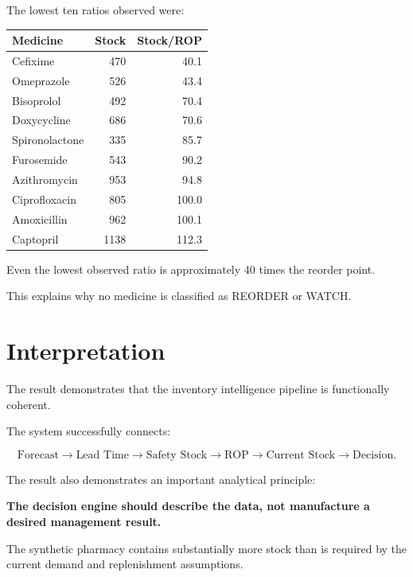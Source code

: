 \documentclass[11pt,a4paper]{article}
\begin{document}
The lowest ten ratios observed were:

\begin{center}
\begin{tabular}{lrr}
\toprule
\textbf{Medicine} & \textbf{Stock} & \textbf{Stock/ROP}\\
\midrule
Cefixime & 470 & 40.1\\
Omeprazole & 526 & 43.4\\
Bisoprolol & 492 & 70.4\\
Doxycycline & 686 & 70.6\\
Spironolactone & 335 & 85.7\\
Furosemide & 543 & 90.2\\
Azithromycin & 953 & 94.8\\
Ciprofloxacin & 805 & 100.0\\
Amoxicillin & 962 & 100.1\\
Captopril & 1138 & 112.3\\
\bottomrule
\end{tabular}
\end{center}

Even the lowest observed ratio is approximately 40 times the
reorder point.

This explains why no medicine is classified as REORDER or WATCH.

\section{Interpretation}

The result demonstrates that the inventory intelligence pipeline is
functionally coherent.

The system successfully connects:

\[
\text{Forecast}
\rightarrow
\text{Lead Time}
\rightarrow
\text{Safety Stock}
\rightarrow
\text{ROP}
\rightarrow
\text{Current Stock}
\rightarrow
\text{Decision}.
\]

The result also demonstrates an important analytical principle:

\begin{tcolorbox}[
    colframe=purpleColor,
    colback=white,
    arc=2mm
]
\centering
\textbf{The decision engine should describe the data, not manufacture
a desired management result.}
\end{tcolorbox}

The synthetic pharmacy contains substantially more stock than is
required by the current demand and replenishment assumptions.
\end{document}
